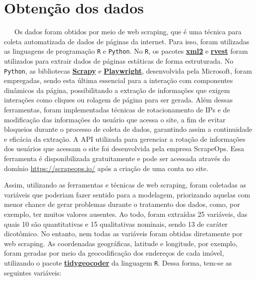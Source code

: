 \documentclass[
  12pt,
  a4paper,
]{scrreprt}
\begin{document}
\section{Obtenção dos dados}\label{obtenuxe7uxe3o-dos-dados}

~~~Os dados foram obtidos por meio de web scraping, que é uma técnica
para coleta automatizada de dados de páginas da internet. Para isso,
foram utilizadas as linguagens de programação \texttt{R} e
\texttt{Python}. No \texttt{R}, os pacotes
\href{https://xml2.r-lib.org/}{\textbf{xml2}} e
\href{https://rvest.tidyverse.org/}{\textbf{rvest}} foram utilizados
para extrair dados de páginas estáticas de forma estruturada. No
\texttt{Python}, as bibliotecas
\href{https://scrapy.org/}{\textbf{Scrapy}} e
\href{https://playwright.dev/python/}{\textbf{Playwright}}, desenvolvida
pela Microsoft, foram empregadas, sendo esta última essencial para a
interação com componentes dinâmicos da página, possibilitando a extração
de informações que exigem interações como cliques ou rolagem de página
para ser gerada. Além dessas ferramentas, foram implementadas técnicas
de rotacionamento de IPs e de modificação das informações do usuário que
acessa o site, a fim de evitar bloqueios durante o processo de coleta de
dados, garantindo assim a continuidade e eficácia da extração. A API
utilizada para gerenciar a rotação de informações dos usuários que
acessam o site foi desenvolvida pela empresa ScrapeOps. Essa ferramenta
é disponibilizada gratuitamente e pode ser acessada através do domínio
\url{https://scrapeops.io/} após a criação de uma conta no site.

\vspace{12pt}

Assim, utilizando as ferramentas e técnicas de web scraping, foram
coletadas as variáveis que poderiam fazer sentido para a modelagem,
priorizando aquelas com menor chance de gerar problemas durante o
tratamento dos dados, como, por exemplo, ter muitos valores ausentes. Ao
todo, foram extraídas 25 variáveis, das quais 10 são quantitativas e 15
qualitativas nominais, sendo 13 de caráter dicotômico. No entanto, nem
todas as variáveis foram obtidas diretamente por web scraping. As
coordenadas geográficas, latitude e longitude, por exemplo, foram
geradas por meio da geocodificação dos endereços de cada imóvel,
utilizando o pacote
\href{https://jessecambon.github.io/tidygeocoder/}{\textbf{tidygeocoder}}
da linguagem \texttt{R}. Dessa forma, tem-se as seguintes variáveis:
\end{document}
